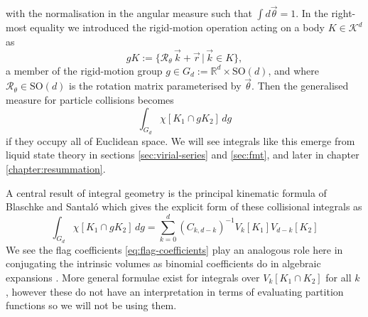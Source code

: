 with the normalisation in the angular measure such that $\int d\vec{\theta} = 1$.
In the right-most equality we introduced the rigid-motion operation acting on a body $K \in \mathcal{K}^d$ as
\begin{equation*}
  g K := \{\mathcal{R}_\theta \, \vec{k} + \vec{r} \, | \, \vec{k} \in K\},
\end{equation*}
a member of the rigid-motion group $g \in G_d := \mathbb{R}^d \times \mathrm{SO}(d)$, and where $\mathcal{R}_\theta \in \mathrm{SO}(d)$%
is the rotation matrix parameterised by $\vec{\theta}$.
Then the generalised measure for particle collisions becomes
\begin{equation*}
  \int_{G_d} \chi[K_1 \cap g K_2] \, dg
\end{equation*}
if they occupy all of Euclidean space.
We will see integrals like this emerge from liquid state theory in sections \ref{sec:virial-series} and \ref{sec:fmt}, and later in chapter \ref{chapter:resummation}.

\vspace{0.5em}

\begin{tcolorbox}[title=Principal kinematic formula]
  A central result of integral geometry is the principal kinematic formula of Blaschke and Santal\'o \cite{BlaschkeMZ1936,Blaschke1937,SantaloASI1936} which gives the explicit form of these collisional integrals as \cite{Santalo2004,Klain1997}
  \begin{equation}\label{eq:binomial-kinematic-formula}
    \int_{G_d} \chi[K_1 \cap g K_2] \, dg
    =
    \sum_{k=0}^d (C_{k,d-k})^{-1} V_k[K_1] V_{d-k}[K_2]
  \end{equation}
  We see the flag coefficients \eqref{eq:flag-coefficients} play an analogous role here in conjugating the intrinsic volumes as binomial coefficients do in algebraic expansions%
  .
  More general formulae exist for integrals over $V_k[K_1 \cap K_2]$ for all $k$ \cite{Klain1997}, however these do not have an interpretation in terms of evaluating partition functions so we will not be using them.
\end{tcolorbox}

